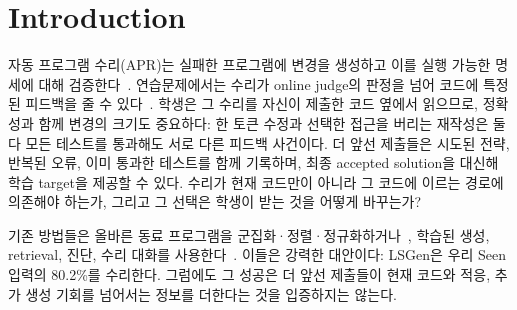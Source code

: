 \documentclass[10pt,conference]{IEEEtran}
\begin{document}
\section{Introduction}
\label{sec:introduction}
자동 프로그램 수리(APR)는 실패한 프로그램에 변경을 생성하고 이를 실행 가능한 명세에 대해 검증한다~\cite{gazzola2019automatic,monperrus2018automatic,weimer2009automatically,legoues2012genprog}. 연습문제에서는 수리가 online judge의 판정을 넘어 코드에 특정된 피드백을 줄 수 있다~\cite{keuning2018systematic,joshi2023repair,zhang2024pydex}. 학생은 그 수리를 자신이 제출한 코드 옆에서 읽으므로, 정확성과 함께 변경의 크기도 중요하다: 한 토큰 수정과 선택한 접근을 버리는 재작성은 둘 다 모든 테스트를 통과해도 서로 다른 피드백 사건이다. 더 앞선 제출들은 시도된 전략, 반복된 오류, 이미 통과한 테스트를 함께 기록하며, 최종 accepted solution을 대신해 학습 target을 제공할 수 있다. 수리가 현재 코드만이 아니라 그 코드에 이르는 경로에 의존해야 하는가, 그리고 그 선택은 학생이 받는 것을 어떻게 바꾸는가?

기존 방법들은 올바른 동료 프로그램을 군집화·정렬·정규화하거나~\cite{gulwani2018automated,wang2018search,hu2020re}, 학습된 생성, retrieval, 진단, 수리 대화를 사용한다~\cite{joshi2023repair,zhang2024pydex,liu2024fastfixer,yang2024cref,orvalho2025counterexample,dai2026learner}. 이들은 강력한 대안이다: LSGen은 우리 Seen 입력의 80.2\%를 수리한다. 그럼에도 그 성공은 더 앞선 제출들이 현재 코드와 적응, 추가 생성 기회를 넘어서는 정보를 더한다는 것을 입증하지는 않는다.
\end{document}
